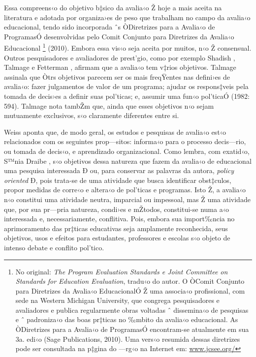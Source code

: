 \documentclass[a4paper, 12pt]{article}
\begin{document}
Essa compreens‹o do objetivo b‡sico da avalia‹o Ž hoje a mais aceita na literatura e adotada por organiza›es de peso que trabalham no campo da avalia‹o educacional, tendo sido incorporada ˆs ÒDiretrizes para a Avalia‹o de ProgramasÓ desenvolvidas pelo Comit Conjunto para Diretrizes da Avalia‹o Educacional \footnote{No original: \emph{The Program Evaluation Standards e Joint Committee on Standards for Education Evaluation}, tradu‹o do autor. O ÒComit Conjunto para Diretrizes da Avalia‹o EducacionalÓ Ž uma associa‹o profissional, com sede na Western Michigan University, que congrega pesquisadores e avaliadores e publica regularmente obras voltadas ˆ dissemina‹o de pesquisas e ˆ padroniza‹o das boas pr‡ticas no ‰mbito da avalia‹o educacional. As ÒDiretrizes para a Avalia‹o de ProgramasÓ encontram-se atualmente em sua 3a. edi‹o (Sage Publications, 2010). Uma vers‹o resumida dessas diretrizes pode ser consultada na p‡gina do —rg‹o na Internet em: \url{ www.jcsee.org/}} (2010). Embora essa vis‹o seja aceita por muitos, n‹o Ž consensual. Outros pesquisadores e avaliadores de prest’gio, como por exemplo Shadish  \citeyear{shadish_need-based_1994,shadish_experimental_2002}, Talmage \citeyear{talmage_evaluation_1982} e Fetterman  \citeyear{fetterman_empowerment_1994}, afirmam que a avalia‹o tem v‡rios objetivos. Talmage assinala que Òtrs objetivos parecem ser os mais freqŸentes nas defini›es de avalia‹o: fazer julgamentos de valor de um programa; ajudar os respons‡veis pela tomada de decis›es a definir suas pol’ticas; e, assumir uma fun‹o pol’ticaÓ (1982: 594). Talmage nota tambŽm que, ainda que esses objetivos n‹o sejam mutuamente exclusivos, s‹o claramente diferentes entre si.

Weiss \citeyear{weiss_how_1997} aponta que, de modo geral, os estudos e pesquisas de avalia‹o est‹o relacionados com os seguintes prop—sitos: informa‹o para o processo decis—rio, ou tomada de decis‹o, e aprendizado organizacional. Como lembra, com exatid‹o, S™nia Draibe \citeyear{draibe_avaliacao_2001}, s‹o objetivos dessa natureza que fazem da avalia‹o de educacional uma pesquisa interessada Ð ou, para conservar as palavras da autora, \emph{policy oriented} Ð, pois trata-se de uma atividade que busca identificar obst‡culos, propor medidas de corre‹o e altera‹o de pol’ticas e programas. Isto Ž, a avalia‹o n‹o constitui uma atividade neutra, imparcial ou impessoal, mas Ž uma atividade que, por sua pr—pria natureza, condi›es e mŽtodos, constitui-se numa a‹o interessada e, necessariamente, conflitiva. Pois, embora sua import‰ncia no aprimoramento das pr‡ticas educativas seja amplamente reconhecida, seus objetivos, usos e efeitos para estudantes, professores e escolas s‹o objeto de intenso debate e conflito pol’tico. 
\end{document}
